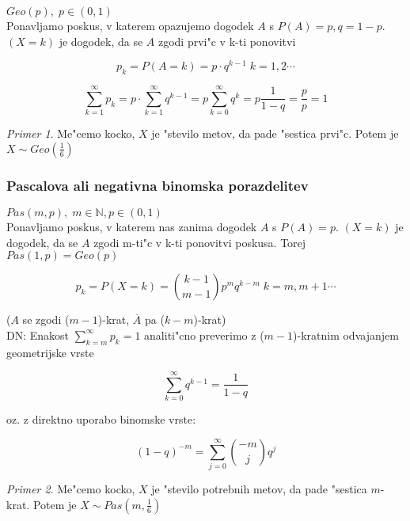 \documentclass[a4paper,12pt]{article}
\theoremstyle{definition}
\theoremstyle{remark}
\newtheorem*{ex}{Primer}
\newcommand{\N}{\mathbb{N}}
\begin{document}
$Geo(p), \; p \in (0,1)$ \\
Ponavljamo poskus, v katerem opazujemo dogodek $A$ s $P(A) = p, q = 1-p$. $(X=k)$ je dogodek, da se $A$ zgodi prvi"c
v k-ti ponovitvi

\begin{equation*}
    p_k = P(A = k) = p \cdot q^{k-1} \; k = 1, 2 \cdots
\end{equation*}

\begin{equation*}
    \sum_{k=1}^{\infty} p_k = p \cdot \sum_{k=1}^{\infty} q^{k-1} = p \sum_{k=0}^{\infty} q^k =
    p \frac{1}{1-q} = \frac{p}{p} = 1
\end{equation*}

\begin{ex}
    Me"cemo kocko, $X$ je "stevilo metov, da pade "sestica prvi"c. Potem je $X \sim Geo(\frac{1}{6})$
\end{ex}

\subsubsection{Pascalova ali negativna binomska porazdelitev}

$Pas(m,p), \; m \in \N, p \in (0,1)$ \\
Ponavljamo poskus, v katerem nas zanima dogodek $A$ s $P(A) = p$. $(X=k)$ je dogodek, da se $A$ zgodi m-ti"c v
k-ti ponovitvi poskusa. Torej $Pas(1,p) = Geo(p)$

\begin{equation*}
    p_k = P(X = k) = \binom{k-1}{m-1} p^m q^{k-m} \; k = m, m+1 \cdots
\end{equation*}

($A$ se zgodi ($m-1$)-krat, $\overline{A}$ pa ($k-m$)-krat) \\
DN: Enakost $\sum_{k=m}^{\infty} p_k = 1$ analiti"cno preverimo z ($m-1$)-kratnim odvajanjem geometrijske vrste

\begin{equation*}
    \sum_{k=0}^{\infty} q^{k-1} = \frac{1}{1-q}
\end{equation*}

oz. z direktno uporabo binomske vrste:

\begin{equation*}
    (1-q)^{-m} = \sum_{j=0}^{\infty} \binom{-m}{j} q^j
\end{equation*}

\begin{ex}
    Me"cemo kocko, $X$ je "stevilo potrebnih metov, da pade "sestica $m$-krat. Potem je $X \sim Pas(m, \frac{1}{6})$
\end{ex}
\end{document}
